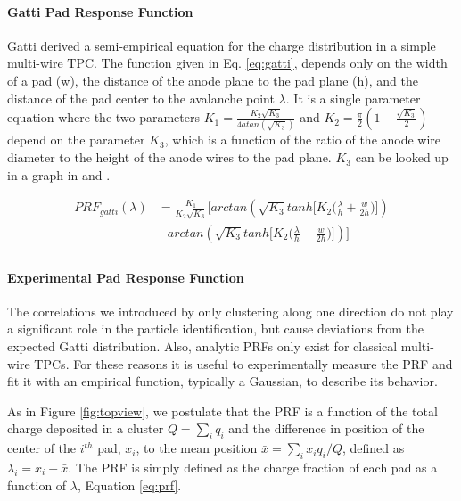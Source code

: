 \documentclass[review]{elsarticle}
\begin{document}
\paragraph{Gatti Pad Response Function}
Gatti \cite{gatti} derived a semi-empirical equation for the charge distribution in a simple multi-wire TPC. The function given in Eq. \ref{eq:gatti}, depends only on the width of a pad (w), the distance of the anode plane to the pad plane (h), and the distance of the pad center to the avalanche point $\lambda$. It is a single parameter equation where the two parameters $K_1 = \frac{K_{2}\sqrt{K_3}}{4 atan(\sqrt{K_3})}$ and $K_2 = \frac{\pi}{2}\left(1-\frac{\sqrt{K_{3}}}{2}\right)$ depend on the parameter $K_3$, which is a function of the ratio of the anode wire diameter to the height of the anode wires to the pad plane. $K_3$ can be looked up in a graph in \cite{blumrol} and \citep{gatti}.

\begin{equation}\label{eq:gatti}
\begin{split}
PRF_{gatti}(\lambda)
& = \frac{K_{1}}{K_{2}\sqrt{K_{3}}}\bigl[arctan(\sqrt{K_{3}}tanh\bigl[K_{2}\bigl(\frac{\lambda}{h}+\frac{w}{2h}\bigr)\bigr]) \\
& - arctan(\sqrt{K_{3}}tanh\bigl[K_{2}\bigl(\frac{\lambda}{h}-\frac{w}{2h}\bigr)\bigr])\bigr] \\
\end{split}
\end{equation}

\paragraph{Experimental Pad Response Function}

The correlations we introduced by only clustering along one direction do not play a significant role in the particle identification, but cause deviations from the expected Gatti distribution. Also, analytic PRFs only exist for classical multi-wire TPCs. For these reasons it is useful to experimentally measure the PRF and fit it with an empirical function, typically a Gaussian, to describe its behavior. 

As in Figure \ref{fig:topview}, we postulate that the PRF is a function of the total charge deposited in a cluster $Q = \sum_i q_i$ and the difference in position of the center of the $i^{th}$ pad, $x_i$, to the mean position $\bar{x} = \sum_i x_i q_i/Q$, defined as $\lambda_i = x_i-\bar{x}$. The PRF is simply defined as the charge fraction of each pad as a function of $\lambda$, Equation \ref{eq:prf}. 
\end{document}
